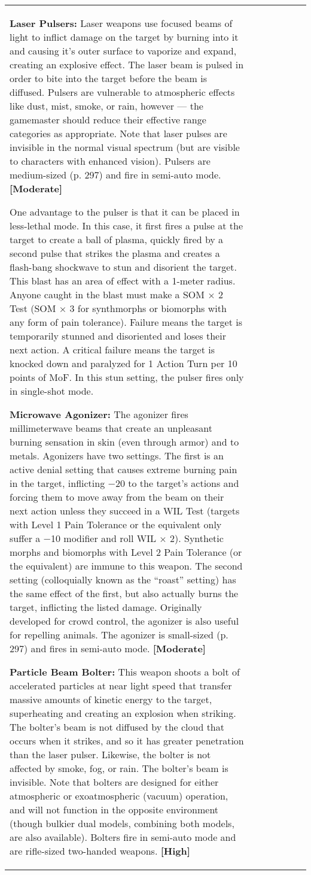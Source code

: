 \begin{tabular}{|l|l|l|l|l|l|l|}
\textbf{Laser Pulsers:} Laser weapons use focused beams of light to inflict damage on the target by burning into it and causing it’s outer surface to vaporize and expand, creating an explosive effect. The laser beam is pulsed in order to bite into the target before the beam is diffused. Pulsers are vulnerable to atmospheric effects like dust, mist, smoke, or rain, however --- the gamemaster should reduce their effective range categories as appropriate. Note that laser pulses are invisible in the normal visual spectrum (but are visible to characters with enhanced vision). Pulsers are medium-sized (p. 297) and fire in semi-auto mode. \textbf{[Moderate]} 

One advantage to the pulser is that it can be placed in less-lethal mode. In this case, it first fires a pulse at the target to create a ball of plasma, quickly fired by a second pulse that strikes the plasma and creates a flash-bang shockwave to stun and disorient the target. This blast has an area of effect with a 1-meter radius. Anyone caught in the blast must make a SOM $\times$ 2 Test (SOM $\times$ 3 for synthmorphs or biomorphs with any form of pain tolerance). Failure means the target is temporarily stunned and disoriented and loses their next action. A critical failure means the target is knocked down and paralyzed for 1 Action Turn per 10 points of MoF. In this stun setting, the pulser fires only in single-shot mode. 

\textbf{Microwave Agonizer:} The agonizer fires millimeterwave beams that create an unpleasant burning sensation in skin (even through armor) and to metals. Agonizers have two settings. The first is an active denial setting that causes extreme burning pain in the target, inflicting $-$20 to the target’s actions and forcing them to move away from the beam on their next action unless they succeed in a WIL Test (targets with Level 1 Pain Tolerance or the equivalent only suffer a $-$10 modifier and roll WIL $\times$ 2). Synthetic morphs and biomorphs with Level 2 Pain Tolerance (or the equivalent) are immune to this weapon. The second setting (colloquially known as the ``roast'' setting) has the same effect of the first, but also actually burns the target, inflicting the listed damage. Originally developed for crowd control, the agonizer is also useful for repelling animals. The agonizer is small-sized (p. 297) and fires in semi-auto mode. \textbf{[Moderate]} 

\textbf{Particle Beam Bolter:} This weapon shoots a bolt of accelerated particles at near light speed that transfer massive amounts of kinetic energy to the target, superheating and creating an explosion when striking. The bolter’s beam is not diffused by the cloud that occurs when it strikes, and so it has greater penetration than the laser pulser. Likewise, the bolter is not affected by smoke, fog, or rain. The bolter’s beam is invisible. Note that bolters are designed for either atmospheric or exoatmospheric (vacuum) operation, and will not function in the opposite environment (though bulkier dual models, combining both models, are also available). Bolters fire in semi-auto mode and are rifle-sized two-handed weapons. \textbf{[High]} 


\end{tabular}
